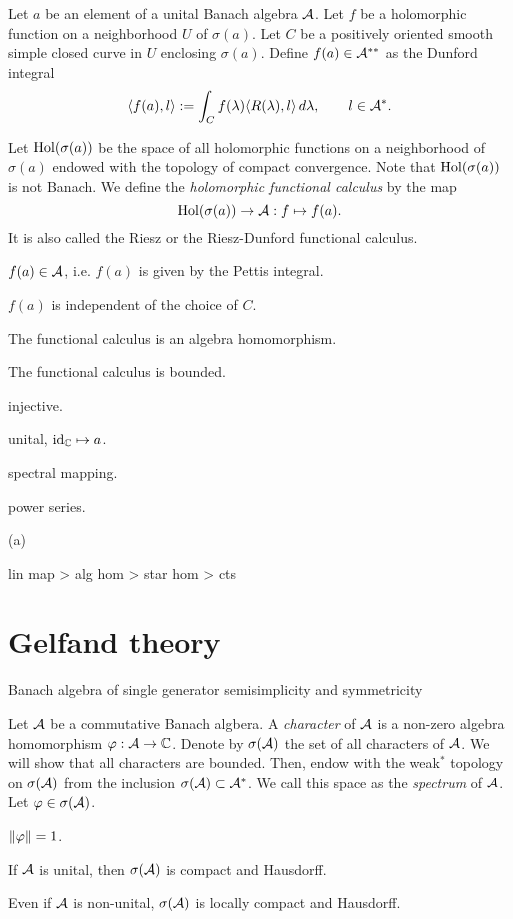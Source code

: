 \documentclass{../../large}
\begin{document}
\begin{prb}
Let $a$ be an element of a unital Banach algebra $\mathcal{A}$.
Let $f$ be a holomorphic function on a neighborhood $U$ of $\sigma(a)$.
Let $C$ be a positively oriented smooth simple closed curve in $U$ enclosing $\sigma(a)$.
Define $f(a)\in\mathcal{A}^{**}$ as the Dunford integral
\[\langle f(a),l\rangle:=\int_Cf(\lambda)\langle R(\lambda),l\rangle\,d\lambda,\qquad l\in\mathcal{A}^*.\]

Let $\operatorname{Hol}(\sigma(a))$ be the space of all holomorphic functions on a neighborhood of $\sigma(a)$ endowed with the topology of compact convergence.
Note that $\operatorname{Hol}(\sigma(a))$ is not Banach.
We define the \emph{holomorphic functional calculus} by the map
\[\operatorname{Hol}(\sigma(a))\to\mathcal{A}:f\mapsto f(a).\]
It is also called the Riesz or the Riesz-Dunford functional calculus.
\begin{parts}
\item $f(a)\in\mathcal{A}$, i.e. $f(a)$ is given by the Pettis integral.
\item $f(a)$ is independent of the choice of $C$.
\item The functional calculus is an algebra homomorphism.
\item The functional calculus is bounded.
\item injective.
\item unital, $\operatorname{id}_{\mathbb{C}}\mapsto a$.
\item spectral mapping.
\item power series.
\end{parts}
\end{prb}
\begin{pf}
(a)


\end{pf}

lin map > alg hom > star hom > cts






\section{Gelfand theory}

Banach algebra of single generator
semisimplicity and symmetricity

\begin{prb}
Let $\mathcal{A}$ be a commutative Banach algbera.
A \emph{character} of $\mathcal{A}$ is a non-zero algebra homomorphism $\varphi:\mathcal{A}\to\mathbb{C}$.
Denote by $\sigma(\mathcal{A})$ the set of all characters of $\mathcal{A}$.
We will show that all characters are bounded.
Then, endow with the weak$^*$ topology on $\sigma(\mathcal{A})$ from the inclusion $\sigma(\mathcal{A})\subset\mathcal{A}^*$.
We call this space as the \emph{spectrum} of $\mathcal{A}$.
Let $\varphi\in\sigma(\mathcal{A})$.
\begin{parts}
\item $\|\varphi\|=1$.
\item If $\mathcal{A}$ is unital, then $\sigma(\mathcal{A})$ is compact and Hausdorff.
\item Even if $\mathcal{A}$ is non-unital, $\sigma(\mathcal{A})$ is locally compact and Hausdorff.
\end{parts}
\end{prb}
\end{document}
